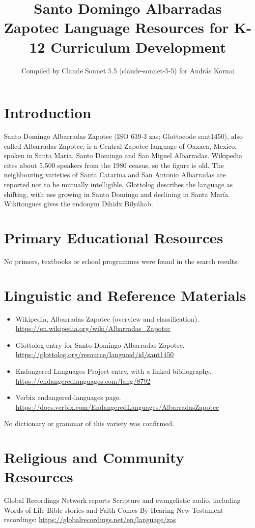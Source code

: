 \documentclass[12pt]{article}
\title{Santo Domingo Albarradas Zapotec Language Resources for K-12 Curriculum Development}
\author{Compiled by Claude Sonnet 5.5 (claude-sonnet-5-5) for Andr\'as Kornai}
\date{}
\begin{document}
\maketitle

\section{Introduction}
Santo Domingo Albarradas Zapotec (ISO 639-3 zas; Glottocode sant1450), also called Albarradas Zapotec, is a Central Zapotec language of Oaxaca, Mexico, spoken in Santa Mar\'ia, Santo Domingo and San Miguel Albarradas. Wikipedia cites about 5,500 speakers from the 1980 census, so the figure is old. The neighbouring varieties of Santa Catarina and San Antonio Albarradas are reported not to be mutually intelligible. Glottolog describes the language as shifting, with use growing in Santo Domingo and declining in Santa Mar\'ia. Wikitongues gives the endonym Dihidx Bily\'ahab.

\section{Primary Educational Resources}
No primers, textbooks or school programmes were found in the search results.

\section{Linguistic and Reference Materials}
\begin{itemize}
\item Wikipedia, Albarradas Zapotec (overview and classification). \url{https://en.wikipedia.org/wiki/Albarradas_Zapotec}
\item Glottolog entry for Santo Domingo Albarradas Zapotec. \url{https://glottolog.org/resource/languoid/id/sant1450}
\item Endangered Languages Project entry, with a linked bibliography. \url{https://endangeredlanguages.com/lang/8792}
\item Verbix endangered-languages page. \url{https://docs.verbix.com/EndangeredLanguages/AlbarradasZapotec}
\end{itemize}
No dictionary or grammar of this variety was confirmed.

\section{Religious and Community Resources}
Global Recordings Network reports Scripture and evangelistic audio, including Words of Life Bible stories and Faith Comes By Hearing New Testament recordings: \url{https://globalrecordings.net/en/language/zas}
\end{document}
